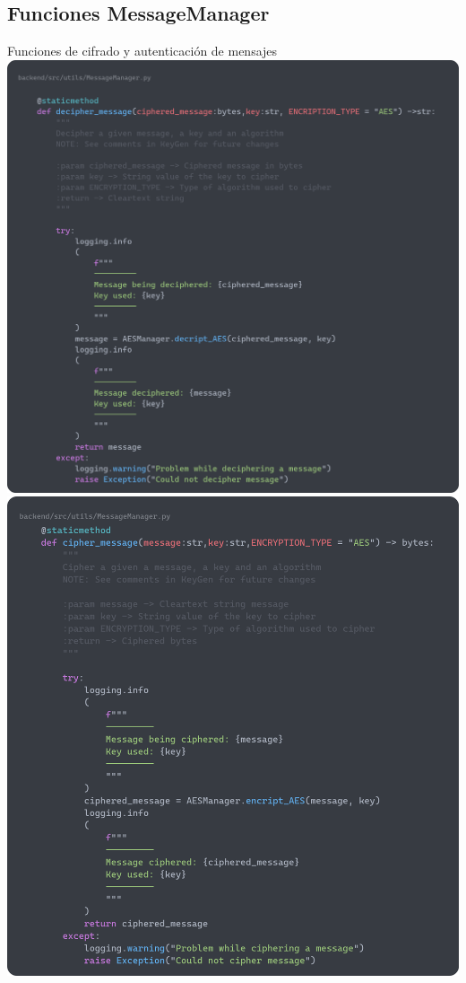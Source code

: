 \documentclass[a4paper,11pt]{article}
\begin{document}
\subsection{Funciones MessageManager}
    \label{sec:MessageManagerCode}
    Funciones de cifrado y autenticación de mensajes
    \vspace{0.5cm}
    \includegraphics[width=\textwidth]{images/MM_Decipher.png}
    \includegraphics[width=\textwidth]{images/MM_cipher.png} 
\end{document}
